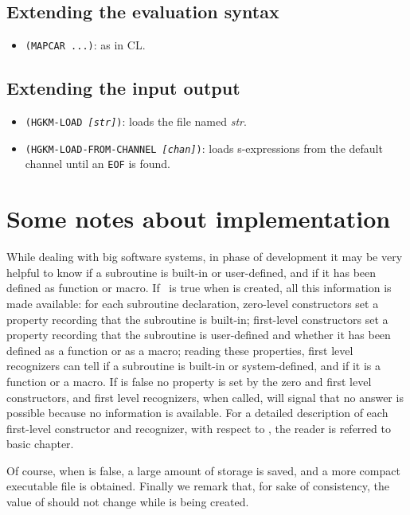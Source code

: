 \subsection{Extending the evaluation syntax}

\begin{itemize}
	\item {\tt (MAPCAR ...)}:
		  as in CL.
\end{itemize}


\subsection{Extending the input output}

\begin{itemize}
	\item {\tt (HGKM-LOAD {\it [str]})}:
		  loads the file named {\it str}.
	\item {\tt (HGKM-LOAD-FROM-CHANNEL {\it [chan]})}:
		 loads s-expressions from the default channel until an {\tt EOF} is
		 found.
\end{itemize}


\appendix
\section{Some notes about implementation}

While dealing with big software systems, in phase of development it may be very
helpful to know if a subroutine is built-in or user-defined, and if it has been
defined as function or macro.
If {\tt \infmode}\ is true when {\HG} is created, all this information is made
available: for each subroutine declaration, zero-level constructors set a
property recording that the subroutine is built-in; first-level constructors
set a property recording that the subroutine is user-defined and whether it has
been defined as a function or as a macro; reading these properties, first level
recognizers can tell if a subroutine is built-in or system-defined, and if it is
a function or a macro.
If {\tt \infmode} is false no property is set by the zero and first level
constructors, and first level recognizers, when called, will signal that no
answer is possible because no information is available.
For a detailed description of each first-level constructor and recognizer, with
respect to {\tt \infmode}, the reader is referred to basic {\HG} chapter.

Of course, when {\tt \infmode} is false, a large amount of storage is saved, and
a more compact {\HG} executable file is obtained.
Finally we remark that, for sake of consistency, the value of {\tt \infmode}
should not change while {\HG} is being created.


